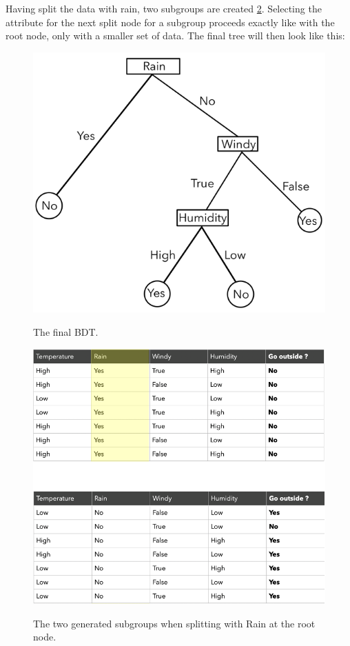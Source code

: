 \documentclass[
12pt,
headsepline,
bibliography=totoc,
twoside=semi,
fleqn
]{scrartcl}
\begin{document}
      Having split the data with rain, two subgroups are created \ref{fig:fig10}. Selecting the attribute for the next split node for a subgroup proceeds exactly like with the root node, only with a smaller set of data. The final tree will then look like this: 

      \begin{figure}[H]
        \centering\includegraphics[scale=0.7]{BDT11.png}\label{fig:fig11}
        \caption{The final BDT.}
        \end{figure}
      

      \begin{figure}[H]
      \centering\includegraphics[scale=0.7]{BDT10.png}\label{fig:fig10}
      \caption{The two generated subgroups when splitting with Rain at the root node.}
      \end{figure}
  
\end{document}
